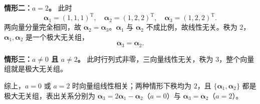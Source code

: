 \textbf{情形二：$a=2$。} 此时
\[
\boldsymbol{\alpha}_1=(1,1,1)^\mathrm{T},\quad
\boldsymbol{\alpha}_2=(1,2,2)^\mathrm{T},\quad
\boldsymbol{\alpha}_3=(1,2,2)^\mathrm{T}.
\]
两向量分量完全相同，故 $\boldsymbol{\alpha}_2=\boldsymbol{\alpha}_3$。$\boldsymbol{\alpha}_1$ 与 $\boldsymbol{\alpha}_2$ 不成比例，故线性无关。秩为 $2$，$\boldsymbol{\alpha}_1,\boldsymbol{\alpha}_2$ 是一个极大无关组，
\[
\boldsymbol{\alpha}_3=\boldsymbol{\alpha}_2.
\]

\textbf{情形三：$a\neq 0$ 且 $a\neq 2$。} 此时行列式非零，三向量线性无关，秩为 $3$，整个向量组就是极大无关组。

综上，$a=0$ 或 $a=2$ 时向量组线性相关；两种情形下秩均为 $2$，且 $\{\boldsymbol{\alpha}_1,\boldsymbol{\alpha}_2\}$ 都是极大无关组，表出关系分别为 $\boldsymbol{\alpha}_3=2\boldsymbol{\alpha}_1-\boldsymbol{\alpha}_2$（$a=0$）与 $\boldsymbol{\alpha}_3=\boldsymbol{\alpha}_2$（$a=2$）。

\else \answerarea[10] \fi%
